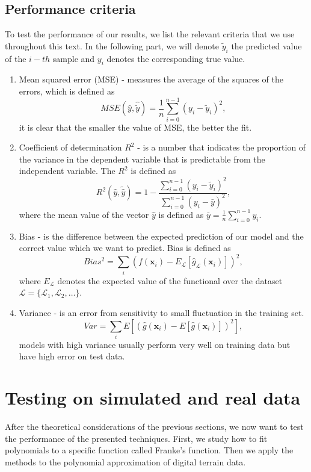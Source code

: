 \documentclass [11pt]{article}
\begin{document}
\subsection{Performance criteria}
To test the performance of our results, we list the relevant criteria that we use throughout this text. In the following part, we will denote $\tilde{y}_i$  the predicted value of the $i-th$ sample and $y_i$ denotes the corresponding true value.\\
\begin{enumerate}
\item Mean squared error (MSE) - measures the average of the squares of the errors, which is defined as
\begin{equation}
MSE(\hat{y},\hat{\tilde{y}}) = \frac{1}{n}
\sum_{i=0}^{n-1}(y_i-\tilde{y}_i)^2,
\end{equation}
it is clear that the smaller the value of MSE, the better the fit.
\item Coefficient of determination $R^{2}$ - is a number that indicates the proportion of the variance in the dependent variable that is predictable from the independent variable. The $R^2$ is defined as
\begin{equation}
R^2(\hat{y}, \tilde{\hat{y}}) = 1 - \frac{\sum_{i=0}^{n - 1} (y_i - \tilde{y}_i)^2}{\sum_{i=0}^{n - 1} (y_i - \bar{y})^2},
\end{equation}
where the mean value of the vector $\hat{y}$ is defined as $\bar{y} =  \frac{1}{n} \sum_{i=0}^{n - 1} y_i$.
\item Bias - is the difference between the expected prediction of our model and the correct value which we want to predict. Bias is defined as
\begin{equation}
Bias^2= \sum_i (f(\boldsymbol{x}_i)-E_\mathcal{L}[\hat{g}_\mathcal{L}(\boldsymbol{x}_i)])^2,
\end{equation}
where $E_{\mathcal{L}}$ denotes the expected value of the functional over the dataset $\mathcal{L}=\{\mathcal{L}_1,
\mathcal{L}_2, \ldots \}$.
\item Variance - is an error from sensitivity to small fluctuation in the training set.
\begin{equation}
Var=\sum_i E[( \hat{g}(\boldsymbol{x}_i)-E[\hat{g}(\boldsymbol{x}_i)])^2],
\end{equation}
models with high variance usually perform very well on training data but have high error on test data.
\end{enumerate}
\section{Testing on simulated and real data}
After the theoretical considerations of the previous sections, we now want to test the performance of the presented techniques. First, we study how to fit polynomials to a specific function called Franke's function. Then we apply the methods to the polynomial approximation of digital terrain data.
\end{document}
